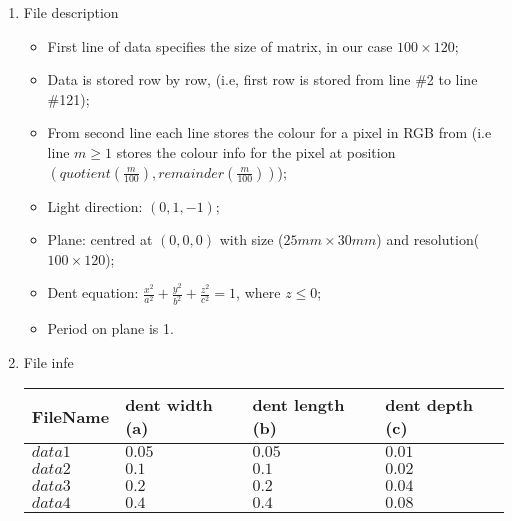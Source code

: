 \documentclass[11pt,twoside]{article}
\begin{document}
\begin{enumerate}[leftmargin=0pt]
\item File description
	\begin{itemize}
	\item First line of data specifies the size of matrix, in our case $100 \times 120$;
	\item Data is stored row by row, (i.e, first row is stored from line \#2 to line \#121);
	\item From second line each line stores the colour for a pixel in RGB from (i.e line $m \geq 1$ stores the colour info for the pixel at position $(quotient(\frac{m}{100}), remainder(\frac{m}{100}))$);
	\item Light direction: $(0, 1 , -1)$;
	\item Plane: centred at $(0,0,0)$ with size ($25mm \times 30mm $) and resolution($100 \times 120$);
	\item Dent equation: $\frac{x^2}{a^2} + \frac{y^2}{b^2} +\frac{z^2}{c^2} = 1$, where $z \leq 0$;
	\item Period on plane is 1.
	\end{itemize}
\item File infe
        \begin{longtable}{|>{\tiny}p{0.5in}|>{\tiny} p{0.7in}| >{\tiny}p{0.7in}|>{\tiny}p{0.7in}|}
        \hline
       	FileName& dent width (a)& dent length (b) & dent depth (c) \\[0.1in]\hline
	$data1$&$0.05$&$0.05$&$0.01$\\[0.1in]\hline
	$data2$&$0.1  $&$0.1$&$0.02$\\[0.1in]\hline
	$data3$&$0.2  $&$0.2$&$0.04$\\[0.1in]\hline
	$data4$&$0.4  $&$0.4$&$0.08$\\[0.1in]\hline
	\end{longtable} 
\end{enumerate}
\end{document}
